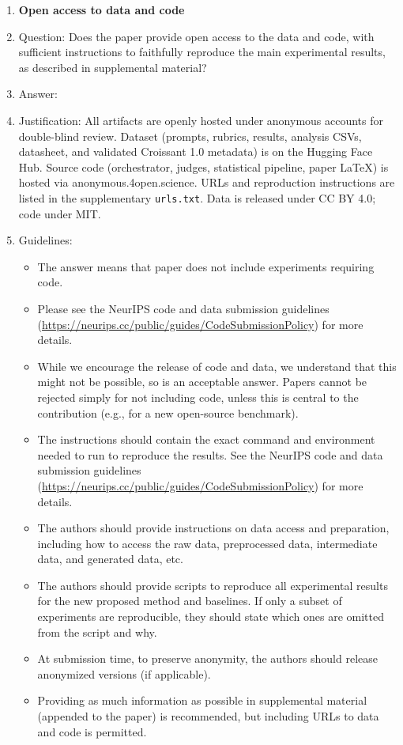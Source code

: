 \begin{enumerate}
\item {\bf Open access to data and code}
    \item[] Question: Does the paper provide open access to the data and code, with sufficient instructions to faithfully reproduce the main experimental results, as described in supplemental material?
    \item[] Answer: \answerYes{}
    \item[] Justification: All artifacts are openly hosted under anonymous accounts for double-blind review. Dataset (prompts, rubrics, results, analysis CSVs, datasheet, and validated Croissant 1.0 metadata) is on the Hugging Face Hub. Source code (orchestrator, judges, statistical pipeline, paper LaTeX) is hosted via anonymous.4open.science. URLs and reproduction instructions are listed in the supplementary \texttt{urls.txt}. Data is released under CC BY 4.0; code under MIT.
    \item[] Guidelines:
    \begin{itemize}
        \item The answer \answerNA{} means that paper does not include experiments requiring code.
        \item Please see the NeurIPS code and data submission guidelines (\url{https://neurips.cc/public/guides/CodeSubmissionPolicy}) for more details.
        \item While we encourage the release of code and data, we understand that this might not be possible, so \answerNo{} is an acceptable answer. Papers cannot be rejected simply for not including code, unless this is central to the contribution (e.g., for a new open-source benchmark).
        \item The instructions should contain the exact command and environment needed to run to reproduce the results. See the NeurIPS code and data submission guidelines (\url{https://neurips.cc/public/guides/CodeSubmissionPolicy}) for more details.
        \item The authors should provide instructions on data access and preparation, including how to access the raw data, preprocessed data, intermediate data, and generated data, etc.
        \item The authors should provide scripts to reproduce all experimental results for the new proposed method and baselines. If only a subset of experiments are reproducible, they should state which ones are omitted from the script and why.
        \item At submission time, to preserve anonymity, the authors should release anonymized versions (if applicable).
        \item Providing as much information as possible in supplemental material (appended to the paper) is recommended, but including URLs to data and code is permitted.
    \end{itemize}



\end{enumerate}
